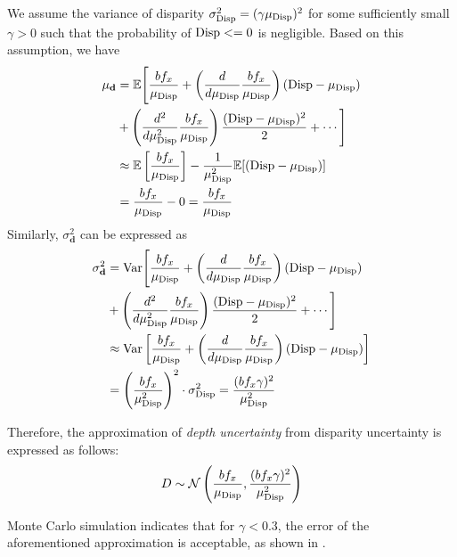 We assume the variance of disparity $\sigma_{{\mathrm{Disp}}}^2 = (\gamma \mu_{\mathrm{Disp}})^2$ for some sufficiently small $\gamma > 0$ such that the probability of ${\mathrm{Disp}} <= 0$ is negligible. Based on this assumption, we have
\begin{equation}
    \begin{aligned}
        \mu_\mathbf{d} &= \mathbb{E}\Biggl[ \frac{bf_x}{\mu_{\mathrm{Disp}}} + \left(\frac{d}{d \mu_{\mathrm{Disp}}}\frac{bf_x}{\mu_{\mathrm{Disp}}}\right)({\mathrm{Disp}} - \mu_{\mathrm{Disp}}) \Biggr.\\
        &+ \Biggl.\left(\frac{d^2}{d \mu_{\mathrm{Disp}}^2}\frac{bf_x}{\mu_{\mathrm{Disp}}}\right)\frac{({\mathrm{Disp}} - \mu_{\mathrm{Disp}})^2}{2} + \cdots \Biggr]\\
            &\approx \mathbb{E}\left[ \frac{bf_x}{\mu_{\mathrm{Disp}}} \right] - \frac{1}{\mu_{\mathrm{Disp}}^2}\mathbb{E}[({\mathrm{Disp}} - \mu_{\mathrm{Disp}})] \\
            &= \frac{bf_x}{\mu_{\mathrm{Disp}}} - 0 =  \frac{bf_x}{\mu_{\mathrm{Disp}}} 
    \end{aligned}
\end{equation}
Similarly, $\sigma_{\mathbf{d}}^2$ can be expressed as
\begin{equation}
    \begin{aligned}
        \sigma_\mathbf{d}^2 &= \mathrm{Var}\Biggl[ \frac{bf_x}{\mu_{\mathrm{Disp}}} + \left(\frac{d}{d \mu_{\mathrm{Disp}}}\frac{bf_x}{\mu_{\mathrm{Disp}}}\right)({\mathrm{Disp}} - \mu_{\mathrm{Disp}}) \Biggr.\\
        &+ \Biggl.\left(\frac{d^2}{d \mu_{\mathrm{Disp}}^2}\frac{bf_x}{\mu_{\mathrm{Disp}}}\right)\frac{({\mathrm{Disp}} - \mu_{\mathrm{Disp}})^2}{2} + \cdots \Biggr]\\
            &\approx \mathrm{Var}\left[ \frac{bf_x}{\mu_{\mathrm{Disp}}} + \left(\frac{d}{d \mu_{\mathrm{Disp}}}\frac{bf_x}{\mu_{\mathrm{Disp}}}\right)({\mathrm{Disp}} - \mu_{\mathrm{Disp}}) \right] \\
            &= \left(\frac{bf_x}{\mu_{\mathrm{Disp}}^2}\right)^2 \cdot \sigma_{\mathrm{Disp}}^2 = \frac{(bf_x\gamma)^2}{\mu_{\mathrm{Disp}}^2}
    \end{aligned}
\end{equation}

Therefore, the approximation of \textit{depth uncertainty} from disparity uncertainty is expressed as follows:
\begin{equation}
    D \sim \mathcal{N}\left(\frac{bf_x}{\mu_{\mathrm{Disp}}},  \frac{(bf_x\gamma)^2}{\mu_{\mathrm{Disp}}^2} \right)
\end{equation}

Monte Carlo simulation indicates that for $\gamma < 0.3$, the error of the aforementioned approximation is acceptable, as shown in .

